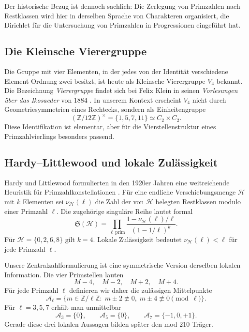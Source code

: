 \documentclass[11pt,a4paper]{article}
\theoremstyle{definition}
\theoremstyle{remark}
\newcommand{\Z}{\mathbb Z}
\begin{document}
Der historische Bezug ist dennoch sachlich: Die Zerlegung von Primzahlen nach Restklassen wird hier in derselben Sprache von Charakteren organisiert, die Dirichlet für die Untersuchung von Primzahlen in Progressionen eingeführt hat.

\subsection{Die Kleinsche Vierergruppe}

Die Gruppe mit vier Elementen, in der jedes von der Identität verschiedene Element Ordnung zwei besitzt, ist heute als Kleinsche Vierergruppe $V_4$ bekannt. Die Bezeichnung \emph{Vierergruppe} findet sich bei Felix Klein in seinen \emph{Vorlesungen über das Ikosaeder} von 1884 \cite{Klein1884}. In unserem Kontext erscheint $V_4$ nicht durch Geometriesymmetrien eines Rechtecks, sondern als Einheitengruppe
\[
(\Z/12\Z)^\times=\{1,5,7,11\}\simeq C_2\times C_2.
\]
Diese Identifikation ist elementar, aber für die Vierstellenstruktur eines Primzahlvierlings besonders passend.

\subsection{Hardy--Littlewood und lokale Zulässigkeit}

Hardy und Littlewood formulierten in den 1920er Jahren eine weitreichende Heuristik für Primzahlkonstellationen \cite{HardyLittlewood1923}. Für eine endliche Verschiebungsmenge $\mathcal H$ mit $k$ Elementen sei $\nu_{\mathcal H}(\ell)$ die Zahl der von $\mathcal H$ belegten Restklassen modulo einer Primzahl $\ell$. Die zugehörige singuläre Reihe lautet formal
\[
\mathfrak S(\mathcal H)
 =\prod_{\ell\ \mathrm{prim}}
 \frac{1-\nu_{\mathcal H}(\ell)/\ell}{(1-1/\ell)^k}.
\]
Für $\mathcal H=\{0,2,6,8\}$ gilt $k=4$. Lokale Zulässigkeit bedeutet $\nu_{\mathcal H}(\ell)<\ell$ für jede Primzahl $\ell$.

Unsere Zentralzahlformulierung ist eine symmetrische Version derselben lokalen Information. Die vier Primstellen lauten
\[
M-4,\quad M-2,\quad M+2,\quad M+4.
\]
Für jede Primzahl $\ell$ definieren wir daher die zulässigen Mittelpunkte
\[
\mathcal A_\ell
 =\bigl\{m\in\Z/\ell\Z:\;m\pm2\not\equiv0,\;m\pm4\not\equiv0\pmod\ell\bigr\}.
\]
Für $\ell=3,5,7$ erhält man unmittelbar
\[
\mathcal A_3=\{0\},\qquad
\mathcal A_5=\{0\},\qquad
\mathcal A_7=\{-1,0,+1\}.
\]
Gerade diese drei lokalen Aussagen bilden später den mod-$210$-Träger.
\end{document}
